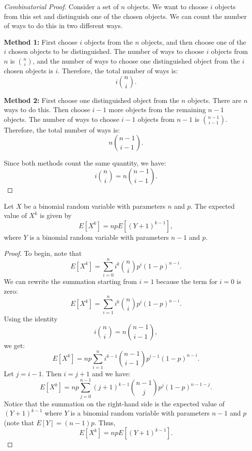 \begin{proof}[Combinatorial Proof]
    Consider a set of \( n \) objects. We want to choose \( i \) objects from this set and distinguish one of the chosen objects. We can count the number of ways to do this in two different ways.

    \textbf{Method 1:} First choose \( i \) objects from the \( n \) objects, and then choose one of the \( i \) chosen objects to be distinguished. The number of ways to choose \( i \) objects from \( n \) is \( \binom{n}{i} \), and the number of ways to choose one distinguished object from the \( i \) chosen objects is \( i \). Therefore, the total number of ways is:
    \[
    i \binom{n}{i}.
    \]

    \textbf{Method 2:} First choose one distinguished object from the \( n \) objects. There are \( n \) ways to do this. Then choose \( i-1 \) more objects from the remaining \( n-1 \) objects. The number of ways to choose \( i-1 \) objects from \( n-1 \) is \( \binom{n-1}{i-1} \). Therefore, the total number of ways is:
    \[
    n \binom{n-1}{i-1}.
    \]

    Since both methods count the same quantity, we have:
    \[
    i \binom{n}{i} = n \binom{n-1}{i-1}.
    \]
\end{proof}

\begin{theorem}
    Let \( X \) be a binomial random variable with parameters \( n \) and \( p \). The expected value of \( X^k \) is given by
    \[
    E[X^k] = npE[(Y + 1)^{k-1}],
    \]
    where \( Y \) is a binomial random variable with parameters \( n-1 \) and \( p \).
\end{theorem}

\begin{proof}
    To begin, note that
    \[
    E[X^k] = \sum_{i=0}^n i^k \binom{n}{i} p^i (1 - p)^{n-i}.
    \]
    We can rewrite the summation starting from \( i = 1 \) because the term for \( i = 0 \) is zero:
    \[
    E[X^k] = \sum_{i=1}^n i^k \binom{n}{i} p^i (1 - p)^{n-i}.
    \]
    Using the identity
    \[
    i \binom{n}{i} = n \binom{n-1}{i-1},
    \]
    we get:
    \[
    E[X^k] = np \sum_{i=1}^n i^{k-1} \binom{n-1}{i-1} p^{i-1} (1 - p)^{n-i}.
    \]
    Let \( j = i - 1 \). Then \( i = j + 1 \) and we have:
    \[
    E[X^k] = np \sum_{j=0}^{n-1} (j+1)^{k-1} \binom{n-1}{j} p^j (1 - p)^{n-1-j}.
    \]
    Notice that the summation on the right-hand side is the expected value of \( (Y + 1)^{k-1} \) where \( Y \) is a binomial random variable with parameters \( n-1 \) and \( p \) (note that $E[Y] = (n-1)p$. Thus,
    \[
    E[X^k] = np E[(Y + 1)^{k-1}].
    \]
\end{proof}

